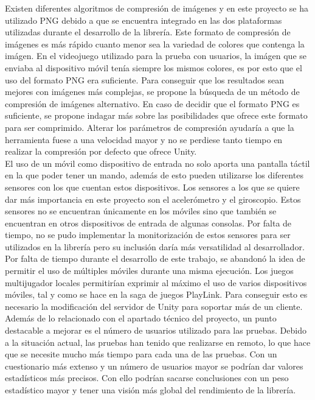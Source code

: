 Existen diferentes algoritmos de compresi\'on de im\'agenes y en este proyecto se ha utilizado PNG debido a que se encuentra integrado en las dos plataformas utilizadas durante el desarrollo de la librer\'ia. Este formato de compresi\'on de im\'agenes es m\'as r\'apido cuanto menor sea la variedad de colores que contenga la im\'agen. En el videojuego utilizado para la prueba con usuarios, la im\'agen que se enviaba al dispositivo m\'ovil ten\'ia siempre los mismos colores, es por esto que el uso del formato PNG era suficiente. Para conseguir que los resultados sean mejores con im\'agenes m\'as complejas, se propone la b\'usqueda de un m\'etodo de compresi\'on de im\'agenes alternativo. En caso de decidir que el formato PNG es suficiente, se propone indagar m\'as sobre las posibilidades que ofrece este formato para ser comprimido. Alterar los par\'ametros de compresi\'on ayudar\'ia a que la herramienta fuese a una velocidad mayor y no se perdiese tanto tiempo en realizar la compresi\'on por defecto que ofrece Unity.\\

El uso de un m\'ovil como dispositivo de entrada no solo aporta una pantalla t\'actil en la que poder tener un mando, adem\'as de esto pueden utilizarse los diferentes sensores con los que cuentan estos dispositivos. Los sensores a los que se quiere dar m\'as importancia en este proyecto son el aceler\'ometro y el giroscopio. Estos sensores no se encuentran \'unicamente en los m\'oviles sino que tambi\'en se encuentran en otros dispositivos de entrada de algunas consolas. Por falta de tiempo, no se pudo implementar la monitorizaci\'on de estos sensores para ser utilizados en la librer\'ia pero su inclusi\'on dar\'ia m\'as versatilidad al desarrollador.\\

Por falta de tiempo durante el desarrollo de este trabajo, se abandon\'o la idea de permitir el uso de m\'ultiples m\'oviles durante una misma ejecuci\'on. Los juegos multijugador locales permitir\'ian exprimir al m\'aximo el uso de varios dispositivos m\'oviles, tal y como se hace en la saga de juegos PlayLink. Para conseguir esto es necesario la modificaci\'on del servidor de Unity para soportar m\'as de un cliente. \\

Adem\'as de lo relacionado con el apartado t\'ecnico del proyecto, un punto destacable a mejorar es el n\'umero de usuarios utilizado para las pruebas. Debido a la situaci\'on actual, las pruebas han tenido que realizarse en remoto, lo que hace que se necesite mucho m\'as tiempo para cada una de las pruebas. Con un cuestionario m\'as extenso y un n\'umero de usuarios mayor se podr\'ian dar valores estad\'isticos m\'as precisos. Con ello podr\'ian sacarse conclusiones con un peso estad\'istico mayor y tener una visi\'on m\'as global del rendimiento de la librer\'ia.
